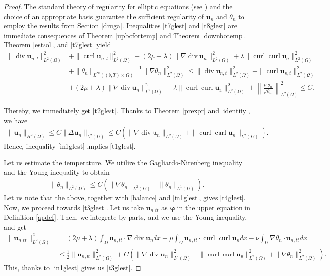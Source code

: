 \documentclass[11pt]{article}
\numberwithin{equation}{section}
\theoremstyle{plain}
\newcommand\bb[1]{\mathbf{#1}}
\newcommand{\tn}{\Omega}
\newcommand{\io}{\int_{\Omega}}
\newcommand{\htwo}{H^2(\Omega)}
\newcommand{\ld}{L^2(\Omega)}
\renewcommand{\div}{\operatorname{div}}
\DeclareMathOperator{\curl}{curl}
\let \phi\varphi
\newcommand{\wspnd}{2\mu+\lambda}
\newcommand{\bu}{\bb{u}}
\newcommand{\bs}[1]{\boldsymbol{#1}}
\begin{document}
\begin{proof}
The standard theory of regularity for elliptic equations (see \cite{Evans, Lady, Amann}) and the choice of an appropriate basis guarantee the sufficient regularity of $\bu_n$ and $\theta_n$ to employ the results from Section \ref{druga}. Inequalities \eqref{t7glest} and \eqref{t8glest} are immediate consequences of Theorem \ref{upbofortemp} and Theorem \ref{downbotemp}.
Theorem \ref{estsol}, and \eqref{t7glest} yield
\begin{align}\label{in1glest}
\nonumber\|\div\bb u_{n,t}\|^2_{\ld}&+\|\curl\bb u_{n,t}\|^2_{\ld}+(\wspnd)\|\nabla\div\bb u_n\|^2_{\ld}+\lambda\|\curl\curl\bb u_n\|^2_{\ld}\\
&+{\|\theta_n\|_{L^{\infty}((0,T)\times\tn)}}^{-1}\|{\nabla\theta_n}\|^2_{\ld}\leq\|\div\bb u_{n,t}\|^2_{\ld}+\|\curl\bb u_{n,t}\|^2_{\ld}\nonumber\\
&+(\wspnd)\|\nabla\div\bb u_n\|^2_{\ld}+\lambda\|\curl\curl\bb u_n\|^2_{\ld}+\left\|\frac{\nabla\theta_n}{\sqrt{\theta_n}}\right\|^2_{\ld}
\leq C.
\end{align}

Thereby, we immediately get \eqref{t2glest}. Thanks to Theorem \ref{prexpr} and \eqref{identity}, we have
\begin{align*}
\|\bb u_n\|_{\htwo}\leq C\|\Delta\bb u_n\|_{\ld}\leq C(\|\nabla\div\bb u_n\|_{\ld}+\|\curl\curl\bb u_n\|_{\ld}).
\end{align*}
Hence, inequality \eqref{in1glest} implies \eqref{t1glest}.

Let us estimate the temperature. We utilize the Gagliardo-Nirenberg inequality and the Young inequality to obtain
\begin{align*}
\|\theta_n\|_{\ld}\leq C(\|\nabla\theta_n\|_{\ld}+\|\theta_n\|_{L^1(\tn)}).
\end{align*}
Let us note that the above, together with \eqref{balance} and \eqref{in1glest}, gives \eqref{t4glest}. Now, we proceed towards \eqref{t3glest}. Let us take $\bb u_{n, tt}$ as $\bs\phi$ in the upper equation in Definition \ref{apdef}. Then, we integrate by parts, and we use the Young inequality, and get
\begin{align*}
\|\bb u_{n,tt}\|^2_{\ld}&=(\wspnd)\io\bb u_{n,tt}\cdot\nabla\div\bb u_n dx-\mu\io\bb u_{n,tt}\cdot\curl\curl\bb u_ndx-\nu\io\nabla\theta_n\cdot\bb u_{n,tt}dx\\
&\leq\frac12\|\bb u_{n,tt}\|^2_{\ld}+C(\|\nabla\div\bb u_n\|_{\ld}^2+\|\curl\curl\bb u_n\|_{\ld}^2+\|\nabla\theta_n\|_{\ld}^2).
\end{align*}
This, thanks to \eqref{in1glest} gives us \eqref{t3glest}.


\end{proof}
\end{document}
